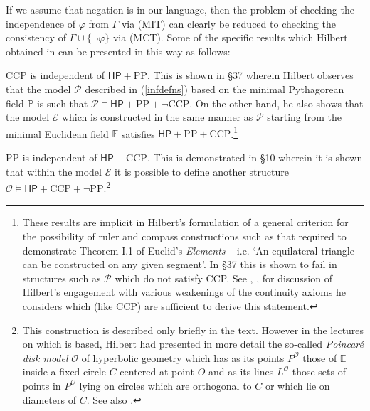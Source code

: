 \documentclass[11pt,fleqn,leqno]{article}
\def\phi{\varphi}
\begin{document}
If we assume that negation is in our language, then the problem of checking the independence of $\phi$ from $\Gamma$ via (MIT) can clearly be reduced to checking the consistency of $\Gamma \cup \{\neg \phi\}$ via (MCT).   Some of the specific results which Hilbert obtained in \citeyearpar{Hilbert1899} can be presented in this way as follows:
\begin{example}
\label{mcr}
\begin{compactenum}[i)]
\item CCP is independent of $\mathsf{HP} + \mathrm{PP}$.   This is shown in \S37 wherein Hilbert observes that the model $\mathcal{P}$ described in (\ref{infdefns}) based on the minimal Pythagorean field $\mathbb{P}$ is such that $\mathcal{P} \models \mathsf{HP} + \mathrm{PP} + \neg \mathrm{CCP}$.  On the other hand, he also shows that the model $\mathcal{E}$ which is constructed in the same manner as $\mathcal{P}$ starting from the minimal Euclidean field $\mathbb{E}$ satisfies $\mathsf{HP} + \mathrm{PP} + \mathrm{CCP}$.\footnote{These results are implicit in Hilbert's formulation of a general criterion for the possibility of ruler and compass constructions such as that required to demonstrate Theorem I.1 of Euclid's \textsl{Elements} -- i.e. `An equilateral triangle can be constructed on any given segment'.     In \S 37 this is shown to fail in structures such as $\mathcal{P}$ which do not satisfy CCP.   See \citep[\S 11]{Hartshorne2000}, \citep[pp. 204-206]{Hilbert2004}, \citep[\S 8.4.3]{Hallett2008} for discussion of Hilbert's engagement with various weakenings of the continuity axioms he considers which (like CCP) are sufficient to derive this statement.\label{CCPnote}}
\item PP is independent of $\mathsf{HP} + \mathrm{CCP}$.   This is demonstrated in \S 10 wherein it is shown that within the model $\mathcal{E}$ it is possible to define another structure $\mathcal{O} \models \mathsf{HP} + \mathrm{CCP} + \neg \mathrm{PP}$.\footnote{This construction is described only briefly in the text.   However in the lectures \citep[pp. 347-359]{Hilbert2004} on which \citeyearpar{Hilbert1899} is based, Hilbert had presented in more detail the so-called  \textsl{Poincar\'e disk model} $\mathcal{O}$ of hyperbolic geometry which has as its points $P^{\mathcal{O}}$ those of $\mathbb{E}$ inside a fixed circle $C$ centered at point $O$ and as its lines $L^{\mathcal{O}}$ those sets of points in $P^{\mathcal{O}}$ lying on circles which are orthogonal to $C$ or which lie on diameters of $C$.  See also \citep[\S 39]{Hartshorne2000}.}   
\end{compactenum}
\end{example}
\end{document}
